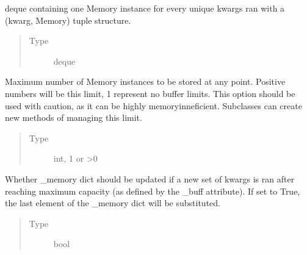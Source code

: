 \documentclass[letterpaper,10pt,english]{sphinxmanual}
\begin{document}
\begin{fulllineitems}
\begin{fulllineitems}
\begin{quote}
\begin{description}
\end{description}\end{quote}

\end{fulllineitems}


\begin{fulllineitems}
\label{\detokenize{dalio.base:dalio.base.memory.LazyRunner._memory}}
deque containing one Memory instance for
every unique kwargs ran with a (kwarg, Memory) tuple structure.
\begin{quote}\begin{description}
\item[{Type}] \leavevmode
deque

\end{description}\end{quote}

\end{fulllineitems}


\begin{fulllineitems}
\label{\detokenize{dalio.base:dalio.base.memory.LazyRunner._buff}}
Maximum number of Memory instances to be stored
at any point. Positive numbers will be this limit, \sphinxhyphen{}1 represent no
buffer limits. This option should be used with caution, as it can
be highly memory\sphinxhyphen{}inneficient. Subclasses can create new methods of
managing this limit.
\begin{quote}\begin{description}
\item[{Type}] \leavevmode
int, \sphinxhyphen{}1 or \textgreater{}0

\end{description}\end{quote}

\end{fulllineitems}


\begin{fulllineitems}
\label{\detokenize{dalio.base:dalio.base.memory.LazyRunner._update}}
Whether \_memory dict should be updated if a new
set of kwargs is ran after reaching maximum capacity (as defined
by the \_buff attribute). If set to True, the last element of the
\_memory dict will be substituted.
\begin{quote}\begin{description}
\item[{Type}] \leavevmode
bool


\end{description}
\end{quote}
\end{fulllineitems}
\end{fulllineitems}
\end{document}
